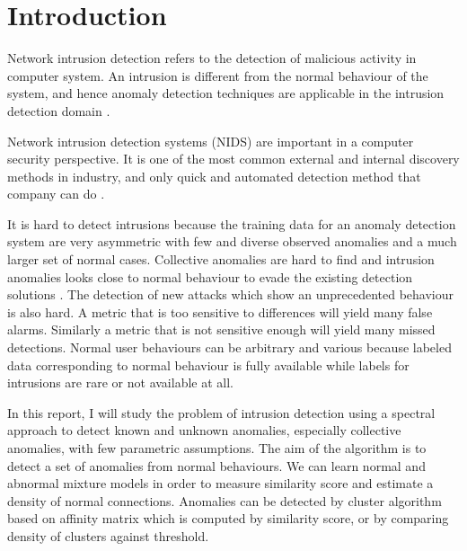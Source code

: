 \section{Introduction}
Network intrusion detection refers to the detection of malicious activity in computer system. 
An intrusion is different from the normal behaviour of the system, and hence anomaly detection techniques are applicable in the intrusion detection domain \cite{chandola09}.

Network intrusion detection systems (NIDS) are important in a computer security perspective. 
It is one of the most common external and internal discovery methods in industry, and only quick and automated detection method that company can do \cite{verizon14}. 

It is hard to detect intrusions because the training data for an anomaly detection system are very asymmetric with few and diverse observed anomalies and a much larger set of normal cases. 
Collective anomalies are hard to find and intrusion anomalies looks close to normal behaviour to evade the existing detection solutions \cite{chandola09}. 
The detection of new attacks which show an unprecedented behaviour is also hard. 
A metric that is too sensitive to differences will yield many false alarms. 
Similarly a metric that is not sensitive enough will yield many missed detections. 
Normal user behaviours can be arbitrary and various because labeled data corresponding to normal behaviour is fully available while labels for intrusions are rare or not available at all. 

In this report, I will study the problem of intrusion detection using a spectral approach to detect known and unknown anomalies, especially collective anomalies, with few parametric assumptions. 
The aim of the algorithm is to detect a set of anomalies from normal behaviours. 
We can learn normal and abnormal mixture models in order to measure similarity score and estimate a density of normal connections. 
Anomalies can be detected by cluster algorithm based on affinity matrix which is computed by similarity score, or by comparing density of clusters against threshold. 
